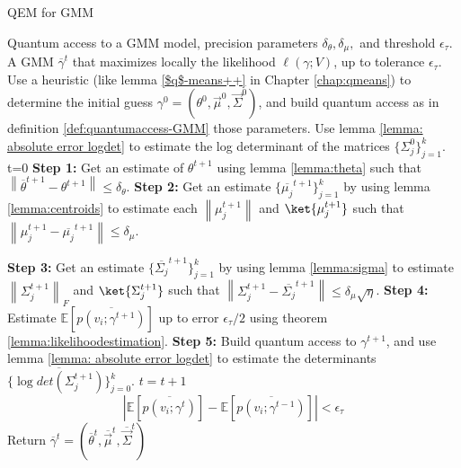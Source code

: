 \documentclass{article}
\newcommand{\norm}[1]{\left\lVert#1\right\rVert}
\begin{document}
\pagestyle{empty} 


\begin{algorithm}[ht]
	\caption{QEM for GMM  } \label{qGMMEM}
	\begin{algorithmic}[1]

			\Require Quantum access to a GMM model, precision parameters $\delta_\theta, \delta_\mu,$ and threshold $\epsilon_\tau$.
			\Ensure  A GMM $\overline{\gamma}^t$ that maximizes locally the likelihood $\ell(\gamma;V)$, up to tolerance $\epsilon_\tau$.
			\vspace{10pt}
			\State Use a heuristic (like lemma \ref{$q$-means++} in Chapter \ref{chap:qmeans}) to determine the initial guess  $\gamma^0=(\theta^0, \vec \mu^0, \vec \Sigma^0)$, and build quantum access as in definition \ref{def:quantumaccess-GMM} those parameters.
			\State Use lemma \ref{lemma: absolute error logdet} to estimate the log determinant of the matrices $\{ \Sigma_j^0 \}_{j=1}^k$.
			\State t=0
			\Repeat
			 \State \textbf{Step 1:} Get an estimate of $\theta^{t+1}$ using lemma \ref{lemma:theta} such that
			 $\norm{\overline{\theta}^{t+1} - \theta^{t+1}} \leq\delta_\theta. $ %
			\State \textbf{Step 2:} Get an estimate $\{ \overline{\mu_j}^{t+1} \}_{j=1}^k$ by using lemma \ref{lemma:centroids} to estimate  each $\norm{\mu_j^{t+1}} $ and $\ket{\mu_j^{t+1}}$ such that
			$\norm{\mu_j^{t+1} - \overline{\mu_j}^{t+1}} \leq \delta_\mu $.

			\State \textbf{Step 3:} Get an estimate $\{ \overline{\Sigma_j}^{t+1} \}_{j=1}^k$ by using lemma \ref{lemma:sigma} to estimate $\norm{\Sigma_j^{t+1}}_F$ and $\ket{\Sigma_j^{t+1}}$ such that
			$ \norm{\Sigma_j^{t+1} - \overline{\Sigma_j}^{t+1} } \leq \delta_{\mu} \sqrt{\eta} $.
			\State \textbf{Step 4:} Estimate $\mathbb{E}[ \overline{p(v_i;\gamma^{t+1})}]$  up to error $\epsilon_\tau/2$ using theorem \ref{lemma:likelihoodestimation}.
			\State \textbf{Step 5:} Build quantum access to $\gamma^{t+1}$, and use lemma \ref{lemma: absolute error logdet} to estimate the determinants $\{ \overline{\log det(\Sigma_j^{t+1})} \}_{j=0}^k$.
			\State $t=t+1$
			\Until
			$$| \mathbb{E}[ \overline{p(v_i;\gamma^{t})}] - \mathbb{E}[\overline{p(v_i;\gamma^{t-1})}] | < \epsilon_\tau$$
			\State Return $\overline{\gamma}^{t}=(\overline{\theta}^t, \overline{\vec \mu}^t, \overline{\vec \Sigma}^t )$
	\end{algorithmic}
\end{algorithm}
\end{document}
